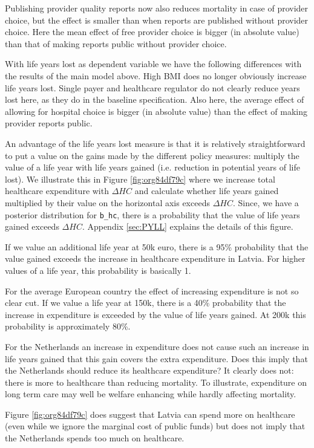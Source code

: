 \documentclass{article}
\begin{document}
Publishing provider quality reports now also reduces mortality in case of provider choice, but the effect is smaller than when reports are published without provider choice. Here the mean effect of free provider choice is bigger (in absolute value) than that of making reports public without provider choice.

With life years lost as dependent variable we have the following differences with the results of the main model above. High BMI does no longer obviously increase life years lost. Single payer and healthcare regulator do not clearly reduce years lost here, as they do in the baseline specification. Also here, the average effect of allowing for hospital choice is bigger (in absolute value) than the effect of making provider reports public.

An advantage of the life years lost measure is that it is relatively straightforward to put a value on the gains made by the different policy measures: multiply the value of a life year with life years gained (i.e. reduction in potential years of life lost). We illustrate this in Figure \ref{fig:org84df79c} where we increase total healthcare expenditure with \(\Delta HC\) and calculate whether life years gained multiplied by their value on the horizontal axis exceeds \(\Delta HC\). Since, we have a posterior distribution for \texttt{b\_hc}, there is a probability that the value of life years gained exceeds \(\Delta HC\). Appendix \ref{sec:PYLL} explains the details of this figure.

If we value an additional life year at 50k euro, there is a 95\% probability that the value gained exceeds the increase in healthcare expenditure in Latvia. For higher values of a life year, this probability is basically 1.

For the average European country the effect of increasing expenditure is not so clear cut. If we value a life year at 150k, there is a 40\% probability that the increase in expenditure is exceeded by the value of life years gained. At 200k this probability is approximately 80\%.

For the Netherlands an increase in expenditure does not cause such an increase in life years gained that this gain covers the extra expenditure. Does this imply that the Netherlands should reduce its healthcare expenditure? It clearly does not: there is more to healthcare than reducing mortality. To illustrate, expenditure on long term care may well be welfare enhancing while hardly affecting mortality.

Figure \ref{fig:org84df79c} does suggest that Latvia can spend more on healthcare (even while we ignore the marginal cost of public funds) but does not imply that the Netherlands spends too much on healthcare.
\end{document}
